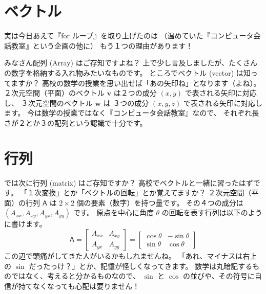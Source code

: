 \documentclass[dvipdfmx,autodetect-engine,10pt,b5paper,papersize,openany,dvipsnames]{jsbook}
\begin{document}
\begin{multicols}{2}
\vspace{5.5cm}


\section*{ベクトル}
実は今日あえて『for ループ』を取り上げたのは
（温めていた『コンピュータ会話教室』という企画の他に）
もう１つの理由があります！

みなさん配列 (Array) はご存知ですよね？
上で少し言及しましたが、たくさんの数字を格納する入れ物みたいなものです。
ところでベクトル (vector) は知ってますか？
高校の数学の授業を思い出せば「あの矢印ね」となります（よね）。
２次元空間（平面）のベクトル $\bm{v}$ は２つの成分 $(x, y)$ で表される矢印に対応し、
３次元空間のベクトル $\bm{w}$ は ３つの成分 $(x, y, z)$ で表される矢印に対応します。
今は数学の授業ではなく『コンピュータ会話教室』なので、
それぞれ長さが２とか３の配列という認識で十分です。

\section*{行列}
では次に行列 (matrix) はご存知ですか？
高校でベクトルと一緒に習ったはずです。
「１次変換」とか「ベクトルの回転」とか覚えてますか？
２次元空間（平面）の行列 $\mathsf{A}$ は $2\times 2$ 個の要素（数字）を持つ量です。
その４つの成分は $(A_{xx}, A_{xy}, A_{yx}, A_{yy})$ です。
原点を中心に角度 $\theta$ の回転を表す行列は以下のように書けます。
\begin{equation*}
  \mathsf{A}
  =
  \left[
  \begin{array}{cc}
    A_{xx} & A_{xy} \\
    A_{yx} & A_{yy}
  \end{array}
  \right]
  =	
  \left[
  \begin{array}{cc}
    \cos\theta & -\sin\theta \\
    \sin\theta & \cos\theta
  \end{array}
  \right]
\end{equation*}
この辺で頭痛がしてきた人がいるかもしれませんね。
「あれ、マイナスは右上の $\sin$ だったっけ？」とか、記憶が怪しくなってきます。
数学は丸暗記するものではなく、考えると分かるものなので、
$\sin$ と $\cos$ の並びや、その符号に自信が持てなくなっても心配は要りません！


\end{multicols}
\end{document}
